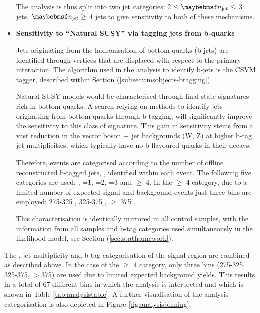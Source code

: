 \begin{itemize}
The analysis is thus split into two jet categories: 2 $\leq \njet \leq$ 3 jets, $\njet \geq$ 4 jets to give sensitivity to both of these mechanisms. 

\item[] \textbf{Sensitivity to  ``Natural \ac{SUSY}'' via tagging jets from b-quarks}

Jets originating from the hadronisation of bottom quarks (b-jets) are identified through vertices that are displaced with respect to the primary interaction. The algorithm used in the analysis to identify b-jets is the \acf{CSVM} tagger, described within Section (\ref{subsec:cmsobjects-btagging}). 

Natural \ac{SUSY} models would be characterised through final-state signatures rich in bottom quarks. A search relying on methods to identify jets originating from bottom quarks through b-tagging, will significantly improve the sensitivity to this class of signature. This gain in sensitivity stems from a vast reduction in the vector boson + jet backgrounds (W, Z) at higher b-tag jet multiplicities, which typically have no b-flavoured quarks in their decays.  

Therefore, events are categorised according to the number of offline reconstructed b-tagged jets, \nbreco, identified within each event. The following five categories are used; , =1, =2, =3 and $\geq$ 4. In the \nbreco $\geq$ 4 category, due to a limited number of expected signal and background events just three \theht bins are employed: 275-325 \GeV, 325-375 \GeV, $\geq$ 375 \GeV.

This characterisation is identically mirrored in all control samples, with the information from all samples and b-tag categories used simultaneously in the likelihood model, see Section (\ref{sec:statframework}).

\end{itemize}
 
 The \theht, jet multiplicity and b-tag categorisation of the signal region are combined as described above. In the case of the \nbreco $\geq$ 4 category, only three \theht bins (275-325, 325-375, $>$375) are used due to limited expected background yields. This results in a total of 67 different bins in which the analysis is interpreted and which is shown in Table \ref{tab:analysistable}. A further visualisation of the analysis categorisation is also depicted in Figure \ref{fig:analysisbinning}. 
 
